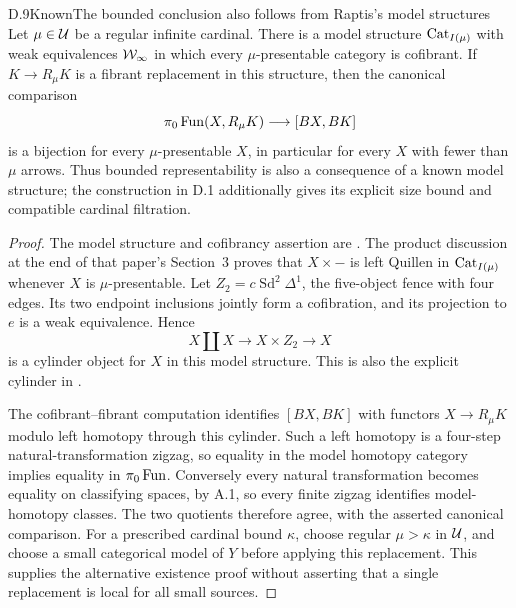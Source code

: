 \begin{claim}{D.9}{Known}{The bounded conclusion also follows from Raptis's model structures}
Let $\mu\in\mathcal U$ be a regular infinite cardinal. There is a model structure $\mathrm{Cat}_{I(\mu)}$ with weak equivalences $\mathcal W_\infty$ in which every $\mu$-presentable category is cofibrant. If $K\to R_\mu K$ is a fibrant replacement in this structure, then the canonical comparison
\[
 \pi_0\operatorname{Fun}(X,R_\mu K)\longrightarrow[BX,BK]
\]
is a bijection for every $\mu$-presentable $X$, in particular for every $X$ with fewer than $\mu$ arrows. Thus bounded representability is also a consequence of a known model structure; the construction in D.1 additionally gives its explicit size bound and compatible cardinal filtration.
\end{claim}
\begin{proof}
The model structure and cofibrancy assertion are \citet[Theorem~3.5]{Raptis2010}. The product discussion at the end of that paper's Section~3 proves that $X\times-$ is left Quillen in $\mathrm{Cat}_{I(\mu)}$ whenever $X$ is $\mu$-presentable. Let $Z_2=c\operatorname{Sd}^2\Delta^1$, the five-object fence with four edges. Its two endpoint inclusions jointly form a cofibration, and its projection to $e$ is a weak equivalence. Hence
\[
 X\amalg X\longrightarrow X\times Z_2\longrightarrow X
\]
is a cylinder object for $X$ in this model structure. This is also the explicit cylinder in \citet[Proposition~4.8 and its proof]{Raptis2010}.

The cofibrant--fibrant computation identifies $[BX,BK]$ with functors $X\to R_\mu K$ modulo left homotopy through this cylinder. Such a left homotopy is a four-step natural-transformation zigzag, so equality in the model homotopy category implies equality in $\pi_0\operatorname{Fun}$. Conversely every natural transformation becomes equality on classifying spaces, by A.1, so every finite zigzag identifies model-homotopy classes. The two quotients therefore agree, with the asserted canonical comparison. For a prescribed cardinal bound $\kappa$, choose regular $\mu>\kappa$ in $\mathcal U$, and choose a small categorical model of $Y$ before applying this replacement. This supplies the alternative existence proof without asserting that a single replacement is local for all small sources.
\end{proof}
